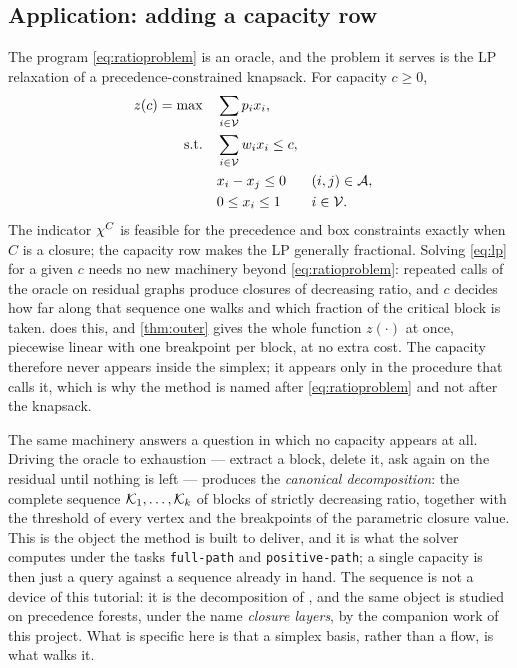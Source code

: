 \subsection{Application: adding a capacity row}\label{sec:capacity}
The program \eqref{eq:ratioproblem} is an oracle, and the problem it serves is the
LP relaxation of a precedence-constrained knapsack. For capacity $c\ge0$,
\begin{subequations}\label{eq:lp}
\begin{align}
 z(c)=\max\quad &\sum_{i\in\mathcal V}p_i x_i,\label{eq:lpobj}\\
 \text{s.t.}\quad &\sum_{i\in\mathcal V}w_i x_i\le c,\label{eq:lpcap}\\
 &x_i-x_j\le0 &&(i,j)\in\mathcal A,\label{eq:lpprec}\\
 &0\le x_i\le1 &&i\in\mathcal V.\label{eq:lpbox}
\end{align}
\end{subequations}
The indicator $\chi^C$ is feasible for the precedence and box constraints
exactly when $C$ is a closure; the capacity row makes the LP generally
fractional. Solving \eqref{eq:lp} for a given $c$ needs no new machinery beyond
\eqref{eq:ratioproblem}: repeated calls of the oracle on residual graphs produce
closures of decreasing ratio, and $c$ decides how far along that sequence one
walks and which fraction of the critical block is taken.
 does this, and \cref{thm:outer} gives the whole function
$z(\cdot)$ at once, piecewise linear with one breakpoint per block, at no
extra cost. The capacity therefore never appears inside the simplex; it appears
only in the procedure that calls it, which is why the method is named after
\eqref{eq:ratioproblem} and not after the knapsack.

The same machinery answers a question in which no capacity appears at all.
Driving the oracle to exhaustion --- extract a block, delete it, ask again on
the residual until nothing is left --- produces the \emph{canonical
decomposition}: the complete sequence $\mathcal K_1,\dots,\mathcal K_k$ of blocks of
strictly decreasing ratio, together with the threshold of every vertex and the
breakpoints of the parametric closure value. This is the object the method is
built to deliver, and it is what the solver computes under the tasks
\texttt{full-path} and \texttt{positive-path}; a single capacity is then just a
query against a sequence already in hand. The sequence is not a device of this
tutorial: it is the decomposition of \citet{Sidney1975}, and the same object is
studied on precedence forests, under the name \emph{closure layers}, by the
companion work of this project. What is specific here is that a simplex basis,
rather than a flow, is what walks it.

